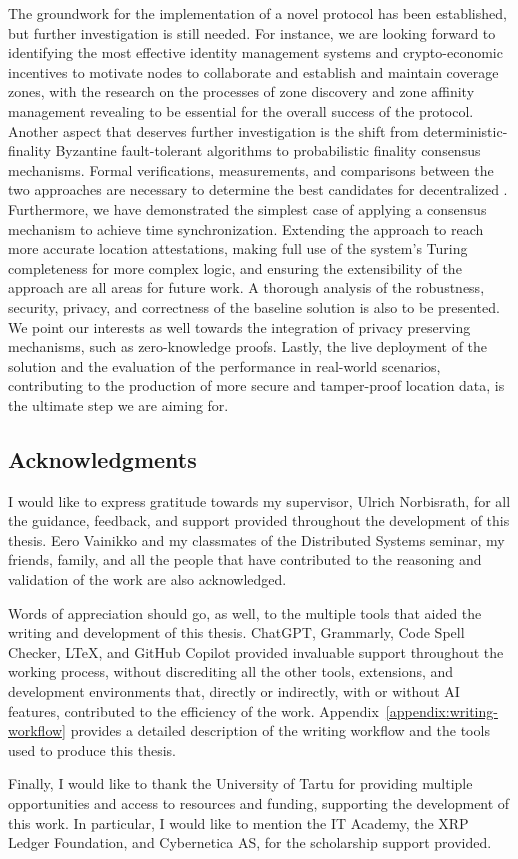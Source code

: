 The groundwork for the implementation of a novel \pol{} protocol has been established, but further investigation is still needed. For instance, we are looking forward to identifying the most effective identity management systems and crypto-economic incentives to motivate nodes to collaborate and establish and maintain coverage zones, with the research on the processes of zone discovery and zone affinity management revealing to be essential for the overall success of the protocol. Another aspect that deserves further investigation is the shift from deterministic-finality Byzantine fault-tolerant algorithms to probabilistic finality consensus mechanisms. Formal verifications, measurements, and comparisons between the two approaches are necessary to determine the best candidates for decentralized \pol{}. Furthermore, we have demonstrated the simplest case of applying a consensus mechanism to achieve time synchronization. Extending the approach to reach more accurate location attestations, making full use of the system's Turing completeness for more complex logic, and ensuring the extensibility of the approach are all areas for future work. A thorough analysis of the robustness, security, privacy, and correctness of the baseline solution is also to be presented. We point our interests as well towards the integration of privacy preserving mechanisms, such as zero-knowledge proofs. Lastly, the live deployment of the solution and the evaluation of the performance in real-world scenarios, contributing to the production of more secure and tamper-proof location data, is the ultimate step we are aiming for.

\subsection*{Acknowledgments}

I would like to express gratitude towards my supervisor, Ulrich Norbisrath, for all the guidance, feedback, and support provided throughout the development of this thesis. Eero Vainikko and my classmates of the Distributed Systems seminar, my friends, family, and all the people that have contributed to the reasoning and validation of the work are also acknowledged.

Words of appreciation should go, as well, to the multiple tools that aided the writing and development of this thesis. ChatGPT, Grammarly, Code Spell Checker, LTeX, and GitHub Copilot provided invaluable support throughout the working process, without discrediting all the other tools, extensions, and development environments that, directly or indirectly, with or without AI features, contributed to the efficiency of the work. Appendix~\ref{appendix:writing-workflow} provides a detailed description of the writing workflow and the tools used to produce this thesis.

Finally, I would like to thank the University of Tartu for providing multiple opportunities and access to resources and funding, supporting the development of this work. In particular, I would like to mention the IT Academy, the XRP Ledger Foundation, and Cybernetica AS, for the scholarship support provided.